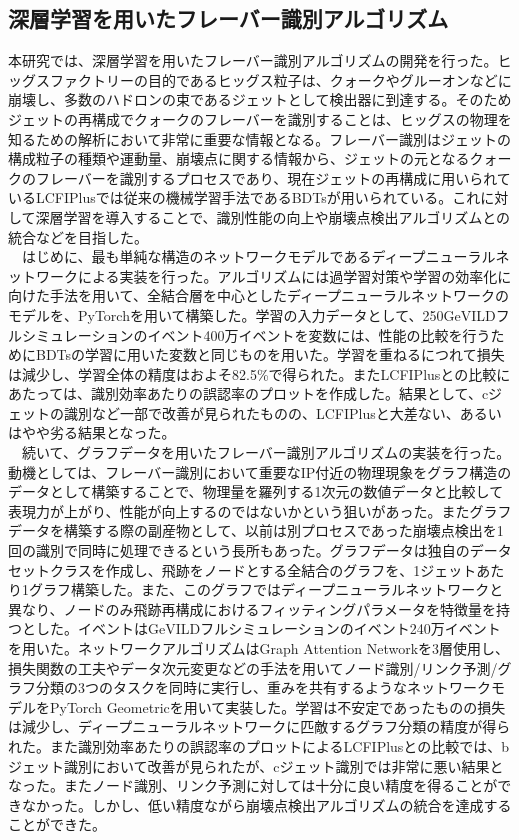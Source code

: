 \subsection*{深層学習を用いたフレーバー識別アルゴリズム}
本研究では、深層学習を用いたフレーバー識別アルゴリズムの開発を行った。ヒッグスファクトリーの目的であるヒッグス粒子は、クォークやグルーオンなどに崩壊し、多数のハドロンの束であるジェットとして検出器に到達する。そのためジェットの再構成でクォークのフレーバーを識別することは、ヒッグスの物理を知るための解析において非常に重要な情報となる。フレーバー識別はジェットの構成粒子の種類や運動量、崩壊点に関する情報から、ジェットの元となるクォークのフレーバーを識別するプロセスであり、現在ジェットの再構成に用いられているLCFIPlusでは従来の機械学習手法であるBDTsが用いられている。これに対して深層学習を導入することで、識別性能の向上や崩壊点検出アルゴリズムとの統合などを目指した。\\
　はじめに、最も単純な構造のネットワークモデルであるディープニューラルネットワークによる実装を行った。アルゴリズムには過学習対策や学習の効率化に向けた手法を用いて、全結合層を中心としたディープニューラルネットワークのモデルを、PyTorchを用いて構築した。学習の入力データとして、250$\mathrm{GeV}$ILDフルシミュレーションのイベント400万イベントを変数には、性能の比較を行うためにBDTsの学習に用いた変数と同じものを用いた。学習を重ねるにつれて損失は減少し、学習全体の精度はおよそ82.5\%で得られた。またLCFIPlusとの比較にあたっては、識別効率あたりの誤認率のプロットを作成した。結果として、cジェットの識別など一部で改善が見られたものの、LCFIPlusと大差ない、あるいはやや劣る結果となった。\\
　続いて、グラフデータを用いたフレーバー識別アルゴリズムの実装を行った。動機としては、フレーバー識別において重要なIP付近の物理現象をグラフ構造のデータとして構築することで、物理量を羅列する1次元の数値データと比較して表現力が上がり、性能が向上するのではないかという狙いがあった。またグラフデータを構築する際の副産物として、以前は別プロセスであった崩壊点検出を1回の識別で同時に処理できるという長所もあった。グラフデータは独自のデータセットクラスを作成し、飛跡をノードとする全結合のグラフを、1ジェットあたり1グラフ構築した。また、このグラフではディープニューラルネットワークと異なり、ノードのみ飛跡再構成におけるフィッティングパラメータを特徴量を持つとした。イベントは$\mathrm{GeV}$ILDフルシミュレーションのイベント240万イベントを用いた。ネットワークアルゴリズムはGraph Attention Networkを3層使用し、損失関数の工夫やデータ次元変更などの手法を用いてノード識別/リンク予測/グラフ分類の3つのタスクを同時に実行し、重みを共有するようなネットワークモデルをPyTorch Geometricを用いて実装した。学習は不安定であったものの損失は減少し、ディープニューラルネットワークに匹敵するグラフ分類の精度が得られた。また識別効率あたりの誤認率のプロットによるLCFIPlusとの比較では、bジェット識別において改善が見られたが、cジェット識別では非常に悪い結果となった。またノード識別、リンク予測に対しては十分に良い精度を得ることができなかった。しかし、低い精度ながら崩壊点検出アルゴリズムの統合を達成することができた。\\

